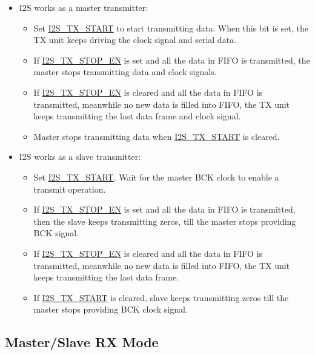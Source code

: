 \documentclass[main\_\_EN.tex]{subfiles}
\begin{document}
\begin{itemize}
    \item I2S works as a master transmitter:
    \begin{itemize}
        \item Set \hyperref[fielddesc:I2STXSTART]{I2S\_TX\_START} to start transmitting data. When this bit is set, the TX unit keeps driving the clock signal and serial data.
        \item If \hyperref[fielddesc:I2STXSTOPEN]{I2S\_TX\_STOP\_EN} is set and all the data in FIFO is transmitted, the master stops transmitting data and clock signals.
        \item If \hyperref[fielddesc:I2STXSTOPEN]{I2S\_TX\_STOP\_EN} is cleared and all the data in FIFO is transmitted, meanwhile no new data is filled into FIFO, the TX unit keeps transmitting the last data frame and clock signal.
        \item Master stops transmitting data when \hyperref[fielddesc:I2STXSTART]{I2S\_TX\_START} is cleared.
    \end{itemize}
    \item I2S works as a slave transmitter:
     \begin{itemize}
        \item Set \hyperref[fielddesc:I2STXSTART]{I2S\_TX\_START}. Wait for the master BCK clock to enable a transmit operation.
        \item If \hyperref[fielddesc:I2STXSTOPEN]{I2S\_TX\_STOP\_EN} is set and all the data in FIFO is transmitted, then the slave keeps transmitting zeros, till the master stops providing BCK signal.
        \item If \hyperref[fielddesc:I2STXSTOPEN]{I2S\_TX\_STOP\_EN} is cleared and all the data in FIFO is transmitted, meanwhile no new data is filled into FIFO, the TX unit keeps transmitting the last data frame. 
        \item If \hyperref[fielddesc:I2STXSTART]{I2S\_TX\_START} is cleared, slave keeps transmitting zeros till the master stops providing BCK clock signal.
    \end{itemize}
\end{itemize}

\subsection{Master/Slave RX Mode}\label{sec:i2s-master-slave-rx-mode}
\end{document}
